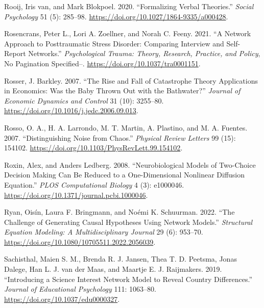 \documentclass[
  a4paper,
  DIV=11,
  numbers=noendperiod,
  oneside]{scrreprt}
\newlength{\cslhangindent}
\newlength{\cslentryspacingunit} %
\newenvironment{CSLReferences}[2] %
 {%
  \setlength{\parindent}{0pt}
  \ifodd #1
  \let\oldpar\par
  \def\par{\hangindent=\cslhangindent\oldpar}
  \fi
  \setlength{\parskip}{#2\cslentryspacingunit}
 }%
 {}
\begin{document}
\begin{CSLReferences}{1}{0}
\leavevmode{}%
Rooij, Iris van, and Mark Blokpoel. 2020. {``Formalizing Verbal
Theories.''} \emph{Social Psychology} 51 (5): 285--98.
\url{https://doi.org/10.1027/1864-9335/a000428}.

\leavevmode{}%
Rosencrans, Peter L., Lori A. Zoellner, and Norah C. Feeny. 2021. {``A
Network Approach to Posttraumatic Stress Disorder: {Comparing} Interview
and Self-Report Networks.''} \emph{Psychological Trauma: Theory,
Research, Practice, and Policy}, No Pagination Specified--.
\url{https://doi.org/10.1037/tra0001151}.

\leavevmode{}%
Rosser, J. Barkley. 2007. {``The Rise and Fall of Catastrophe Theory
Applications in Economics: {Was} the Baby Thrown Out with the
Bathwater?''} \emph{Journal of Economic Dynamics and Control} 31 (10):
3255--80. \url{https://doi.org/10.1016/j.jedc.2006.09.013}.

\leavevmode{}%
Rosso, O. A., H. A. Larrondo, M. T. Martin, A. Plastino, and M. A.
Fuentes. 2007. {``Distinguishing Noise from Chaos.''} \emph{Physical
Review Letters} 99 (15): 154102.
\url{https://doi.org/10.1103/PhysRevLett.99.154102}.

\leavevmode{}%
Roxin, Alex, and Anders Ledberg. 2008. {``Neurobiological {Models} of
{Two-Choice Decision Making Can Be Reduced} to a {One-Dimensional
Nonlinear Diffusion Equation}.''} \emph{PLOS Computational Biology} 4
(3): e1000046. \url{https://doi.org/10.1371/journal.pcbi.1000046}.

\leavevmode{}%
Ryan, Oisín, Laura F. Bringmann, and Noémi K. Schuurman. 2022. {``The
{Challenge} of {Generating Causal Hypotheses Using Network Models}.''}
\emph{Structural Equation Modeling: A Multidisciplinary Journal} 29 (6):
953--70. \url{https://doi.org/10.1080/10705511.2022.2056039}.

\leavevmode{}%
Sachisthal, Maien S. M., Brenda R. J. Jansen, Thea T. D. Peetsma, Jonas
Dalege, Han L. J. van der Maas, and Maartje E. J. Raijmakers. 2019.
{``Introducing a Science Interest Network Model to Reveal Country
Differences.''} \emph{Journal of Educational Psychology} 111: 1063--80.
\url{https://doi.org/10.1037/edu0000327}.


\end{CSLReferences}
\end{document}
